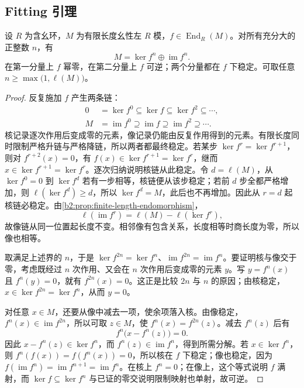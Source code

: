\subsection{Fitting 引理}
\label{b2:subsec:1203:02}

\begin{lemma}[Fitting]\label{b2:lem:fitting}
	设 \(R\) 为含幺环，\(M\) 为有限长度幺性左 \(R\) 模，\(f\in\operatorname{End}_R(M)\)。对所有充分大的正整数 \(n\)，有
	\[
		M=\ker f^n\oplus\operatorname{im}f^n.
	\]
	在第一分量上 \(f\) 幂零，在第二分量上 \(f\) 可逆；两个分量都在 \(f\) 下稳定。可取任意 \(n\ge\max\bigl(1,\ell(M)\bigr)\)。
\end{lemma}
\begin{proof}
	反复施加 \(f\) 产生两条链：
	\[
		\begin{aligned}
			0&=\ker f^0\subseteq\ker f\subseteq\ker f^2\subseteq\cdots,\\
			M&=\operatorname{im}f^0\supseteq\operatorname{im}f\supseteq\operatorname{im}f^2\supseteq\cdots.
		\end{aligned}
	\]
	核记录逐次作用后变成零的元素，像记录仍能由反复作用得到的元素。有限长度同时限制严格升链与严格降链，所以两者都最终稳定。若某步 \(\ker f^r=\ker f^{r+1}\)，则对 \(f^{r+2}(x)=0\)，有 \(f(x)\in\ker f^{r+1}=\ker f^r\)，继而 \(x\in\ker f^{r+1}=\ker f^r\)。逐次归纳说明核链从此稳定。令 \(d=\ell(M)\)，从 \(\ker f^0=0\) 到 \(\ker f^d\) 若有一步相等，核链便从该步稳定；若前 \(d\) 步全都严格增加，则 \(\ell(\ker f^d)\ge d\)，所以 \(\ker f^d=M\)，此后也不再增加。因此从 \(r=d\) 起核链必稳定。由\cref{b2:prop:finite-length-endomorphism}，
	\[
		\ell(\operatorname{im}f^r)=\ell(M)-\ell(\ker f^r),
	\]
	故像链从同一位置起长度不变。相邻像有包含关系，长度相等时商长度为零，所以像也相等。

	取满足上述界的 \(n\)，于是 \(\ker f^{2n}=\ker f^n\)、\(\operatorname{im}f^{2n}=\operatorname{im}f^n\)。要证明核与像交于零，考虑既经过 \(n\) 次作用、又会在 \(n\) 次作用后变成零的元素 \(y\)。写 \(y=f^n(x)\) 且 \(f^n(y)=0\)，就有 \(f^{2n}(x)=0\)。这正是比较 \(2n\) 与 \(n\) 的原因；由核稳定，\(x\in\ker f^{2n}=\ker f^n\)，从而 \(y=0\)。

	对任意 \(x\in M\)，还要从像中减去一项，使余项落入核。由像稳定，\(f^n(x)\in\operatorname{im}f^{2n}\)，所以可取 \(z\in M\)，使 \(f^n(x)=f^{2n}(z)\)。减去 \(f^n(z)\) 后有
	\[
		f^n\bigl(x-f^n(z)\bigr)=0.
	\]
	因此 \(x-f^n(z)\in\ker f^n\)，而 \(f^n(z)\in\operatorname{im}f^n\)，得到所需分解。若 \(x\in\ker f^n\)，则 \(f^n(f(x))=f(f^n(x))=0\)，所以核在 \(f\) 下稳定；像也稳定，因为 \(f(\operatorname{im}f^n)=\operatorname{im}f^{n+1}=\operatorname{im}f^n\)。在核上 \(f^n=0\)；在像上，这个等式说明 \(f\) 满射，而 \(\ker f\subseteq\ker f^n\) 与已证的零交说明限制映射也单射，故可逆。
\end{proof}

